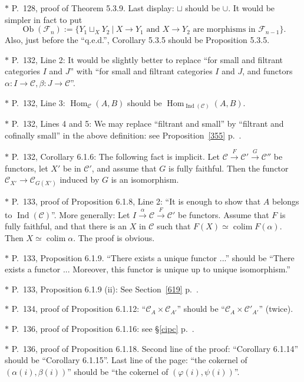\documentclass[12pt]{article}%
\theoremstyle{remark}
\theoremstyle{definition}
\newcommand{\C}{\mathcal C}
\newcommand{\F}{\mathcal F}
\DeclareMathOperator*{\colim}{colim}
\DeclareMathOperator{\Hom}{Hom}%
\DeclareMathOperator{\Ind}{Ind}
\DeclareMathOperator{\Ob}{Ob}
\begin{document}
\noindent $*$ P.~128, proof of Theorem 5.3.9. Last display: $\sqcup$ should be $\cup$. It would be simpler in fact to put 
$$
\Ob(\F_n):=\{Y_1\sqcup_XY_2\ |\ X\to Y_1\text{ and }X\to Y_2\text{ are morphisms in }\F_{n-1}\}.
$$ 
Also, just before the ``q.e.d.'', Corollary 5.3.5 should be Proposition 5.3.5.

\noindent $*$ P.~132, Line 2: It would be slightly better to replace ``for small and filtrant categories $I$ and $J$'' with ``for small and filtrant categories $I$ and $J$, and functors $\alpha:I\to\C,\beta:J\to\C$''.

\noindent $*$ P.~132, Line 3: $\Hom_\C(A,B)$ should be $\Hom_{\Ind(\C)}(A,B)$.

\noindent $*$ P.~132, Lines 4 and 5: \guillemotleft We may replace ``filtrant and small'' by ``filtrant and cofinally small'' in the above definition\guillemotright: see Proposition~\ref{355} p.~\pageref{355}.

\noindent $*$ P.~132, Corollary 6.1.6: The following fact is implicit. Let $\C\xrightarrow{F}\C'\xrightarrow{G}\C''$ be functors, let $X'$ be in $\C'$, and assume that $G$ is fully faithful. Then the functor $\C_{X'}\to\C_{G(X')}$ induced by $G$ is an isomorphism.

\noindent $*$ P.~133, proof of Proposition 6.1.8, Line 2: ``It is enough to show that $A$ belongs to $\Ind(\C)$''. More generally: Let $I\xrightarrow{\alpha}\C\xrightarrow{F}\C'$ be functors. Assume that $F$ is fully faithful, and that there is an $X$ in $\C$ such that $F(X)\simeq\colim F(\alpha)$. Then $X\simeq\colim\alpha$. The proof is obvious.

\noindent $*$ P.~133, Proposition 6.1.9. ``There exists a unique functor ...'' should be ``There exists a functor ... Moreover, this functor is unique up to unique isomorphism.''

\noindent $*$ P.~133, Proposition 6.1.9 (ii): See Section~\ref{619} p.~\pageref{619}.

\noindent $*$ P.~134, proof of Proposition 6.1.12: ``$\C_A\times\C_{A'}$'' should be ``$\C_A\times\C'_{A'}$'' (twice).

\noindent $*$ P.~136, proof of Proposition 6.1.16: see \S\ref{cipc} p.~\pageref{cipc}.

\noindent $*$ P.~136, proof of Proposition 6.1.18. Second line of the proof: ``Corollary 6.1.14'' should be ``Corollary 6.1.15''. Last line of the page: ``the cokernel of $(\alpha(i),\beta(i))$'' should be ``the cokernel of $(\varphi(i),\psi(i))$''.
\end{document}
